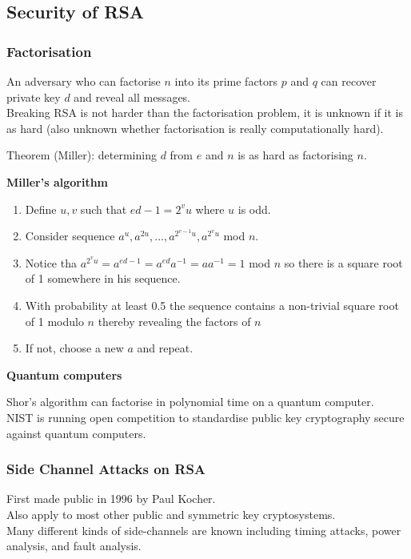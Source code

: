 \documentclass{article}
\begin{document}
\subsection{Security of RSA}

\subsubsection{Factorisation}

An adversary who can factorise $n$ into its prime factors $p$ and $q$ can recover private key $d$ and reveal all messages.\\
Breaking RSA is not harder than the factorisation problem, it is unknown if it is as hard (also unknown whether factorisation is really computationally hard).

Theorem (Miller): determining $d$ from $e$ and $n$ is as hard as factorising $n$.

\textbf{Miller's algorithm}

\begin{enumerate}
    \item Define $u,v$ such that $ed-1=2^v u$ where $u$ is odd.
    \item Consider sequence $a^u, a^{2u}, ..., a^{2^{v-1}u}, a^{2^{v}u}$ mod $n$.
    \item Notice tha $a^{2^vu}=a^{ed-1}=a^{ed}a^{-1}=aa^{-1}=1$ mod $n$ so there is a square root of 1 somewhere in his sequence.
    \item With probability at least 0.5 the sequence contains a non-trivial square root of 1 modulo $n$ thereby revealing the factors of $n$
    \item If not, choose a new $a$ and repeat.
\end{enumerate}

\textbf{Quantum computers}

Shor's algorithm can factorise in polynomial time on a quantum computer.\\
NIST is running open competition to standardise public key cryptography secure against quantum computers.

\subsubsection{Side Channel Attacks on RSA}

First made public in 1996 by Paul Kocher.\\
Also apply to most other public and symmetric key cryptosystems.\\
Many different kinds of side-channels are known including timing attacks, power analysis, and fault analysis.
\end{document}
